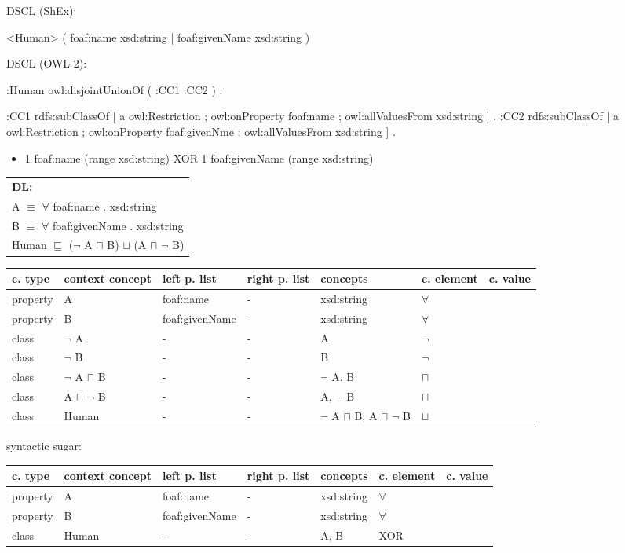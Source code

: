 \documentclass{llncs}
\newenvironment{gcotable}{
  \scriptsize
  \sffamily
  \vspace{0.3cm}
  \begin{tabular}{l|l|l|l|l|l|l}
  \hline
  \textbf{c. type} & \textbf{context concept} & \textbf{left p. list} & \textbf{right p. list} & \textbf{concepts} & \textbf{c. element} & \textbf{c. value} \\
  \hline

}{
  \hline
  \end{tabular}
  \linebreak
}
\newenvironment{DL}{
  \scriptsize
  \sffamily
  \vspace{0.3cm}
  \begin{tabular}{l}
	\textbf{DL:} \\

}{
  \end{tabular}
  \linebreak
}
\begin{document}
DSCL (ShEx):
\begin{ex}
<Human> { (  
    foaf:name xsd:string | 
    foaf:givenName xsd:string ) }
\end{ex}

DSCL (OWL 2):
\begin{ex}
:Human owl:disjointUnionOf ( :CC1 :CC2 ) . 

:CC1 rdfs:subClassOf [
    a owl:Restriction ;
    owl:onProperty foaf:name ;
    owl:allValuesFrom xsd:string ] .
:CC2 rdfs:subClassOf [
    a owl:Restriction ;
    owl:onProperty foaf:givenNme ;
    owl:allValuesFrom xsd:string ] .
\end{ex}

\begin{itemize}
	\item 1 foaf:name (range xsd:string) XOR 1 foaf:givenName (range xsd:string)
\end{itemize}

\begin{DL}
A $\equiv$ $\forall$ foaf:name . xsd:string \\
B $\equiv$ $\forall$ foaf:givenName . xsd:string \\ 
Human $\sqsubseteq$ ($\neg$ A $\sqcap$ B) $\sqcup$ (A $\sqcap$ $\neg$ B) \\
\end{DL}

\begin{gcotable}
property & A & foaf:name & - & xsd:string & $\forall$ \\
property & B & foaf:givenName & - & xsd:string & $\forall$ \\
class & $\neg$ A & - & - & A & $\neg$ \\
class & $\neg$ B & - & - & B & $\neg$ \\
class & $\neg$ A $\sqcap$ B & - & - & $\neg$ A, B & $\sqcap$ \\
class & A $\sqcap$ $\neg$ B & - & - & A, $\neg$ B & $\sqcap$ \\
class & Human & - & - & $\neg$ A $\sqcap$ B, A $\sqcap$ $\neg$ B & $\sqcup$ \\
\end{gcotable}

syntactic sugar:

\begin{gcotable}
property & A & foaf:name & - & xsd:string & $\forall$ \\
property & B & foaf:givenName & - & xsd:string & $\forall$ \\
class & Human & - & - & A, B & XOR \\
\end{gcotable}
\end{document}
